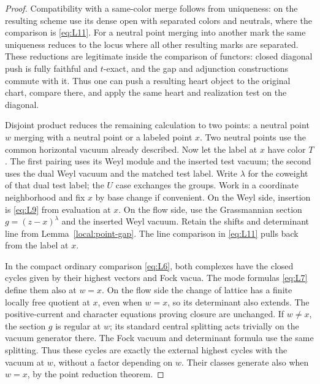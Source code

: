 \begin{proof}
Compatibility with a same-color merge follows from uniqueness:
on the resulting scheme use its dense open with separated
colors and neutrals, where the comparison is \eqref{eq:L11}.
For a neutral point merging into another mark the same uniqueness
reduces to the locus where all other resulting marks are separated.
These reductions are legitimate inside the comparison of functors:
closed diagonal push is fully faithful and $t$-exact, and the gap
and adjunction constructions commute with it.  Thus one can push
a resulting heart object to the original chart, compare there,
and apply the same heart and realization test on the diagonal.

Disjoint product reduces the remaining calculation to two points:
a neutral point $w$ merging with a neutral point or a labeled
point $x$.  Two neutral points use the common horizontal vacuum
already described.  Now let the label at $x$ have color $T$.
The first pairing uses its Weyl module and the inserted test vacuum;
the second uses the dual Weyl vacuum and the matched test label.
Write $\lambda$ for the coweight of that dual test label; the $U$
case exchanges the groups.  Work in a coordinate neighborhood and
fix $x$ by base change if convenient.  On the
Weyl side, insertion is \eqref{eq:L9} from evaluation at $x$.
On the flow side, use the Grassmannian section
$g=(z-x)^\lambda$ and the inserted Weyl vacuum.  Retain the shifts
and determinant line from Lemma~\ref{local:point-gap}.  The line
comparison in \eqref{eq:L11} pulls back from the label at $x$.

In the compact ordinary comparison \eqref{eq:L6}, both complexes
have the closed cycles given by their highest vectors and Fock
vacua.  The mode formulas \eqref{eq:L7} define them also at $w=x$.
On the flow side the change of lattice has a finite locally free
quotient at $x$, even when $w=x$, so its determinant also extends.
The positive-current and character equations proving closure
are unchanged.  If $w\ne x$, the section $g$ is regular at $w$;
its standard central splitting acts trivially on the vacuum
generator there.  The Fock vacuum and determinant formula use
the same splitting.  Thus these cycles are exactly the external
highest cycles with the vacuum at $w$, without a factor depending
on $w$.  Their classes generate also when $w=x$, by the point
reduction theorem.


\end{proof}
